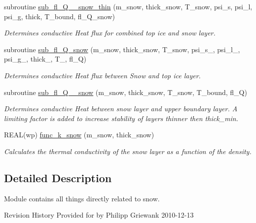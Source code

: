 \begin{DoxyCompactItemize}
subroutine \hyperlink{namespacemo__snow_ab464267664e63624ed508606189bd9a5}{sub\_\-fl\_\-Q\_\_\-snow\_\-thin} (m\_\-snow, thick\_\-snow, T\_\-snow, psi\_\-s, psi\_\-l, psi\_\-g, thick, T\_\-bound, fl\_\-Q\_\-snow)
\begin{DoxyCompactList}\small\item\em Determines conductive Heat flux for combined top ice and snow layer. \item\end{DoxyCompactList}\item 
subroutine \hyperlink{namespacemo__snow_a8a1a43bdb1400602404c56efd1c33e51}{sub\_\-fl\_\-Q\_\-snow} (m\_\-snow, thick\_\-snow, T\_\-snow, psi\_\-s\_, psi\_\-l\_, psi\_\-g\_, thick\_, T\_, fl\_\-Q)
\begin{DoxyCompactList}\small\item\em Determines conductive Heat flux between Snow and top ice layer. \item\end{DoxyCompactList}\item 
subroutine \hyperlink{namespacemo__snow_ae998551477b1c51b6a7dfe7688da0c16}{sub\_\-fl\_\-Q\_\_\-snow} (m\_\-snow, thick\_\-snow, T\_\-snow, T\_\-bound, fl\_\-Q)
\begin{DoxyCompactList}\small\item\em Determines conductive Heat between snow layer and upper boundary layer. A limiting factor is added to increase stability of layers thinner then thick\_\-min. \item\end{DoxyCompactList}\item 
REAL(wp) \hyperlink{namespacemo__snow_ae04b8ab00ed0ed7c4f89c56d3893bbfe}{func\_\-k\_\-snow} (m\_\-snow, thick\_\-snow)
\begin{DoxyCompactList}\small\item\em Calculates the thermal conductivity of the snow layer as a function of the density. \item\end{DoxyCompactList}\end{DoxyCompactItemize}


\subsection{Detailed Description}
Module contains all things directly related to snow. \begin{DoxyParagraph}{Revision History}
Provided for by Philipp Griewank 2010-\/12-\/13 
\end{DoxyParagraph}


